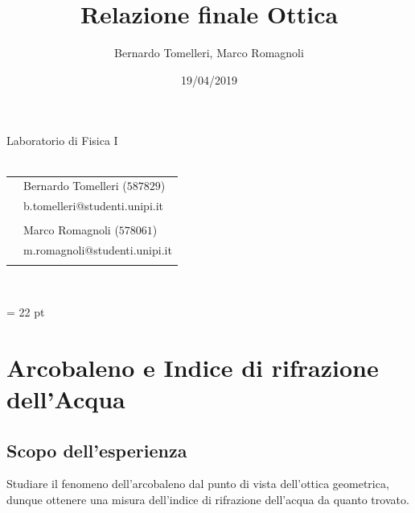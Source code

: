 \documentclass{report}[a4paper,11pt]
\title{Relazione finale Ottica}
\author{Bernardo Tomelleri, Marco Romagnoli}
\date{19/04/2019}
\begin{document}
\begin{titlepage}
	\begin{center}
		{\huge{Laboratorio di Fisica I}}\\\vspace*{7mm}
		{\huge{\textbf{\thetitle}}}\\\vspace*{15mm}
		\begin{tabular}{ll}
		& Bernardo Tomelleri ($587829$) \\
		& b.tomelleri@studenti.unipi.it\\ \\
		& Marco Romagnoli ($578061$) \\
		& m.romagnoli@studenti.unipi.it \\ \\
		\end{tabular}\\\vspace*{5mm}
		{\thedate}
	\end{center}
\end{titlepage}
\makeatother
\restoregeometry
\newpage

\tableofcontents

\vspace{2cm}
\emergencystretch = 22 pt

\chapter{Arcobaleno e Indice di rifrazione dell'Acqua}
\section{Scopo dell'esperienza}
Studiare il fenomeno dell'arcobaleno dal punto di vista dell'ottica geometrica, dunque ottenere una misura dell'indice di rifrazione dell'acqua da quanto trovato.
\end{document}
